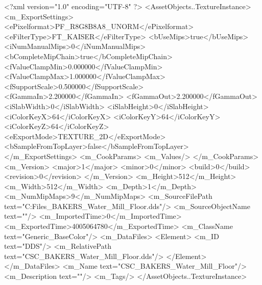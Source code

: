 <?xml version="1.0" encoding="UTF-8" ?>
<AssetObjects..TextureInstance>
	<m_ExportSettings>
		<ePixelformat>PF_R8G8B8A8_UNORM</ePixelformat>
		<eFilterType>FT_KAISER</eFilterType>
		<bUseMips>true</bUseMips>
		<iNumManualMips>0</iNumManualMips>
		<bCompleteMipChain>true</bCompleteMipChain>
		<fValueClampMin>0.000000</fValueClampMin>
		<fValueClampMax>1.000000</fValueClampMax>
		<fSupportScale>0.500000</fSupportScale>
		<fGammaIn>2.200000</fGammaIn>
		<fGammaOut>2.200000</fGammaOut>
		<iSlabWidth>0</iSlabWidth>
		<iSlabHeight>0</iSlabHeight>
		<iColorKeyX>64</iColorKeyX>
		<iColorKeyY>64</iColorKeyY>
		<iColorKeyZ>64</iColorKeyZ>
		<eExportMode>TEXTURE_2D</eExportMode>
		<bSampleFromTopLayer>false</bSampleFromTopLayer>
	</m_ExportSettings>
	<m_CookParams>
		<m_Values/>
	</m_CookParams>
	<m_Version>
		<major>1</major>
		<minor>0</minor>
		<build>0</build>
		<revision>0</revision>
	</m_Version>
	<m_Height>512</m_Height>
	<m_Width>512</m_Width>
	<m_Depth>1</m_Depth>
	<m_NumMipMaps>9</m_NumMipMaps>
	<m_SourceFilePath text="C:\Users\Shadow\Desktop\Working Files\Textures\CSC_BAKERS_Water_Mill_Floor.dds"/>
	<m_SourceObjectName text=""/>
	<m_ImportedTime>0</m_ImportedTime>
	<m_ExportedTime>4005064780</m_ExportedTime>
	<m_ClassName text="Generic_BaseColor"/>
	<m_DataFiles>
		<Element>
			<m_ID text="DDS"/>
			<m_RelativePath text="CSC_BAKERS_Water_Mill_Floor.dds"/>
		</Element>
	</m_DataFiles>
	<m_Name text="CSC_BAKERS_Water_Mill_Floor"/>
	<m_Description text=""/>
	<m_Tags/>
</AssetObjects..TextureInstance>

